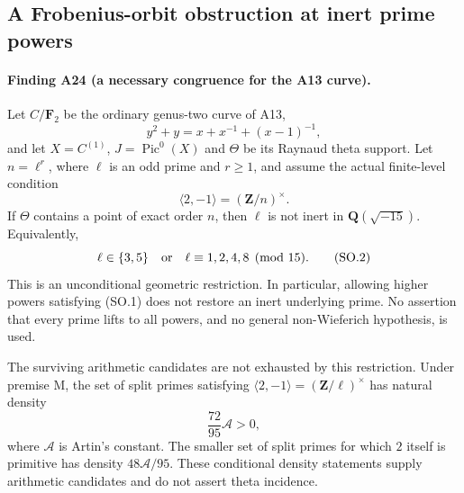 \subsection{A Frobenius-orbit obstruction at inert prime powers}
\label{sec:frobenius-sidon}

\paragraph{Finding A24 (a necessary congruence for the A13 curve).}
Let $C/\mathbf F_2$ be the ordinary genus-two curve of A13,
\[
             y^2+y=x+x^{-1}+(x-1)^{-1},
\]
and let $X=C^{(1)}$, $J=\operatorname{Pic}^0(X)$ and $\Theta$
be its Raynaud theta support.  Let $n=\ell^r$, where $\ell$
is an odd prime and $r\ge1$, and assume the actual finite-level
condition
\[
                   \langle2,-1\rangle=(\mathbf Z/n)^\times.
                                                        \tag{SO.1}
\]
If $\Theta$ contains a point of exact order $n$, then $\ell$
is not inert in $\mathbf Q(\sqrt{-15})$.  Equivalently,
\[
        \ell\in\{3,5\}\quad\hbox{or}\quad
                    \ell\equiv1,2,4,8\pmod {15}.          \tag{SO.2}
\]
This is an unconditional geometric restriction.  In particular,
allowing higher powers satisfying (SO.1) does not restore an
inert underlying prime.  No assertion that every prime lifts to
all powers, and no general non-Wieferich hypothesis, is used.

The surviving arithmetic candidates are not exhausted by this
restriction.  Under premise M, the set of split primes satisfying
$\langle2,-1\rangle=(\mathbf Z/\ell)^\times$ has natural density
\[
                         \frac{72}{95}\mathcal A>0,        \tag{SO.3}
\]
where $\mathcal A$ is Artin's constant.  The smaller set of split
primes for which $2$ itself is primitive has density
$48\mathcal A/95$.  These conditional density statements supply
arithmetic candidates and do not assert theta incidence.

